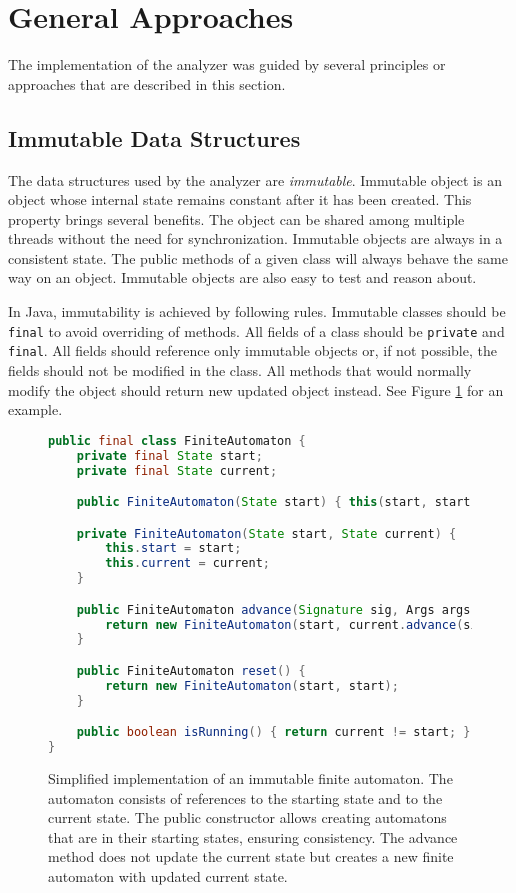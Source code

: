 {\color{blue}\lipsum[3]}

\section{General Approaches}
The implementation of the analyzer was guided by several principles or
approaches that are described in this section.

\subsection{Immutable Data Structures}

The data structures used by the analyzer are \emph{immutable}. Immutable object
is an object whose internal state remains constant after it has been created.
This property brings several benefits. The object can be shared among multiple
threads without the need for synchronization. Immutable objects are always in a
consistent state. The public methods of a given class will always behave the
same way on an object. Immutable objects are also easy to test and reason about.

In Java, immutability is achieved by following rules. Immutable classes should
be \texttt{final} to avoid overriding of methods. All fields of a class
should be \texttt{private} and \texttt{final}. All fields should reference only
immutable objects or, if not possible, the fields should not be modified in the
class. All methods that would normally modify the object should return new
updated object instead. See Figure \ref{immutable} for an example.

\begin{figure}[hbt]
    \label{immutable}
    \begin{lstlisting}[language=java]
public final class FiniteAutomaton {
    private final State start;
    private final State current;

    public FiniteAutomaton(State start) { this(start, start); }

    private FiniteAutomaton(State start, State current) {
        this.start = start;
        this.current = current;
    }

    public FiniteAutomaton advance(Signature sig, Args args) {
        return new FiniteAutomaton(start, current.advance(sig, args));
    }

    public FiniteAutomaton reset() {
        return new FiniteAutomaton(start, start);
    }

    public boolean isRunning() { return current != start; }
}
\end{lstlisting}
    \caption{Simplified implementation of an immutable finite automaton. The
    automaton consists of references to the starting state and to the current
    state. The public constructor allows creating automatons that are in their
    starting states, ensuring consistency. The advance method does not update
    the current state but creates a new finite automaton with updated current
    state.}
\end{figure}

